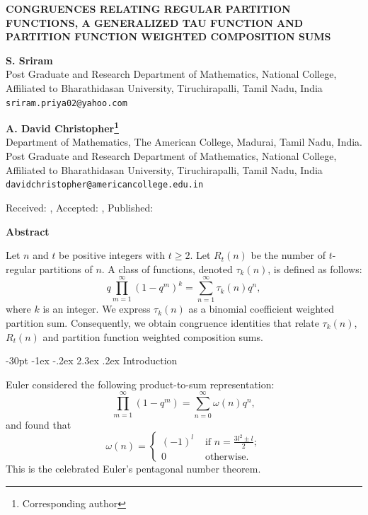 \documentclass[10pt]{article}
\makeatletter
\renewcommand\section{\@startsection {section}{1}{\z@}
{-30pt \@plus -1ex \@minus -.2ex}
{2.3ex \@plus.2ex}
{\normalfont\normalsize\bfseries\boldmath}}
\theoremstyle{definition}
\makeatother
\begin{document}
\begin{center}
{\bf CONGRUENCES RELATING REGULAR PARTITION FUNCTIONS, A GENERALIZED TAU FUNCTION AND PARTITION FUNCTION WEIGHTED COMPOSITION SUMS}\vskip 20pt 

{\bf S. Sriram}\\
{\smallit Post Graduate and Research Department of Mathematics, National College, \\ Affiliated to Bharathidasan University, Tiruchirapalli, Tamil Nadu, India}\\
{\tt sriram.priya02@yahoo.com}\\
\vskip 20pt

{\bf A. David Christopher\footnote{Corresponding author}}\\
{\smallit Department of Mathematics, The American College, Madurai, Tamil Nadu, India.}\\
{\smallit Post Graduate and Research Department of Mathematics, National College,\\ Affiliated to Bharathidasan University, Tiruchirapalli, Tamil Nadu, India}\\
{\tt davidchristopher@americancollege.edu.in}\\
\vskip 20pt
\end{center}

\vskip 20pt
\centerline{\smallit Received: , Accepted: , Published: }
\vskip 30pt

\centerline{\bf Abstract}

\noindent
Let $n$ and $t$ be positive integers with $t\geq 2$. Let $R_t(n)$ be the number of $t$-regular partitions of $n$. 
A class of functions, denoted $\tau_k(n)$, is defined as follows:
\[
q\prod_{m=1}^{\infty}(1-q^m)^k=\sum_{n=1}^{\infty}\tau_k(n)q^n,
\]
where $k$ is an integer. We express $\tau_k(n)$ as a binomial coefficient weighted partition sum. Consequently, we obtain congruence identities that relate $\tau_k(n)$, $R_t(n)$ and partition function weighted composition sums. 

\pagestyle{myheadings}
\thispagestyle{empty}
\baselineskip=12.875pt

\vskip 30pt
\section{Introduction}


Euler \cite{euler} considered the following product-to-sum representation:
\begin{equation*}
\prod_{m=1}^{\infty}(1-q^m)=\sum_{n=0}^{\infty}\omega(n)q^n,
\end{equation*}
and found that 
\begin{equation}\label{PNT}
\omega(n)=\begin{cases}
(-1)^{l}&\text{ if }n=\frac{3l^2\pm l}{2};\\
0&\text{ otherwise.}
\end{cases}
\end{equation}
This is the celebrated Euler's pentagonal number theorem.
\end{document}
